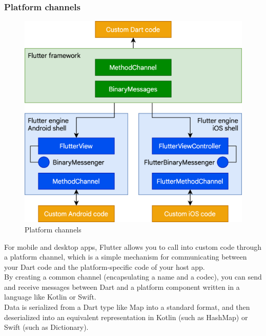 \documentclass[table, 12pt]{article}
\begin{document}
\subsubsection{Platform channels}
\begin{figure}[H]
    \includegraphics[width=\textwidth]{assets/FlutterFlow.png}
    \caption{Platform channels}
    \label{spring_mvc_request}
\end{figure}
For mobile and desktop apps, Flutter allows you to call into custom code through a platform channel, which is a simple mechanism for communicating between your Dart code and the platform-specific code of your host app.\\
By creating a common channel (encapsulating a name and a codec), you can send and receive messages between Dart and a platform component written in a language like Kotlin or Swift.\\
Data is serialized from a Dart type like Map into a standard format, and then deserialized into an equivalent representation in Kotlin (such as HashMap) or Swift (such as Dictionary).
\end{document}
